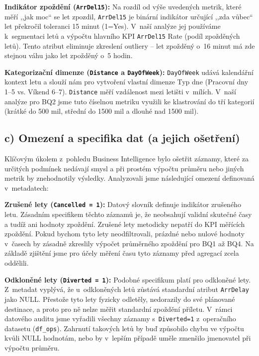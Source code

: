 \documentclass{protokol}
\begin{document}
\textbf{Indikátor zpoždění (\texttt{ArrDel15}):} Na rozdíl od výše uvedených metrik, které měří ,,jak moc`` se let zpozdil, \texttt{ArrDel15} je binární indikátor určující ,,zda vůbec`` let překročil toleranci 15 minut (1=Yes). V~naší analýze jej používáme k~segmentaci letů a výpočtu hlavního KPI \texttt{ArrDel15} Rate (podíl zpožděných letů). Tento atribut eliminuje zkreslení outliery -- let zpožděný o~16 minut má zde stejnou váhu jako let zpožděný o~5 hodin.

\textbf{Kategorizační dimenze (\texttt{Distance} a \texttt{DayOfWeek}):} \texttt{DayOfWeek} udává kalendářní kontext letu a slouží nám pro vytvoření vlastní dimenze Typ dne (Pracovní dny 1--5 vs. Víkend 6--7). \texttt{Distance} měří vzdálenost mezi letišti v~mílích. V~naší analýze pro BQ2 jsme tuto číselnou metriku využili ke klastrování do tří kategorií (krátké do 500 mil, střední do 1500 mil a dlouhé nad 1500 mil).

\subsection{c) Omezení a specifika dat (a jejich ošetření)}

Klíčovým úkolem z~pohledu Business Intelligence bylo ošetřit záznamy, které za určitých podmínek nedávají smysl a při prostém výpočtu průměru nebo jiných metrik by znehodnotily výsledky. Analyzovali jsme následující omezení definovaná v~metadatech:

\textbf{Zrušené lety (\texttt{Cancelled = 1}):} Datový slovník definuje indikátor zrušeného letu. Zásadním specifikem těchto záznamů je, že neobsahují validní skutečné časy a tudíž ani hodnoty zpoždění. Zrušené lety metodicky nepatří do KPI měřících zpoždění. Pokud bychom tyto lety neodfiltrovali, prázdné nebo nulové hodnoty v~časech by zásadně zkreslily výpočet průměrného zpoždění pro BQ1 až BQ4. Na základě zjištění jsme pro účely měření času tyto záznamy před agregací zcela oddělili.

\textbf{Odkloněné lety (\texttt{Diverted = 1}):} Podobné specifikum platí pro odkloněné lety. Z~metadat vyplývá, že u~odkloněných letů zůstává standardní atribut \texttt{ArrDelay} jako NULL. Přestože tyto lety fyzicky odletěly, nedorazily do své plánované destinace, a proto pro ně nelze měřit standardní zpoždění příletu. V~rámci datového auditu jsme vyřadili všechny záznamy s~\texttt{Diverted=1} z~operačního datasetu (\texttt{df\_ops}). Zahrnutí takových letů by buď způsobilo chybu ve výpočtu kvůli NULL hodnotám, nebo by v~lepším případě uměle zmenšilo jmenovatel při výpočtu průměru.
\end{document}
